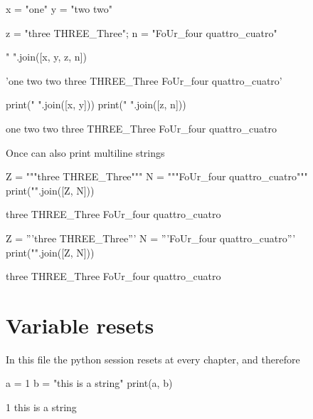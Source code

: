 \documentclass{book}
\begin{document}
\begin{pycell}
x = "one"
y = "two two"
\end{pycell}

\begin{pycell}
z = "three THREE_Three"; n = "FoUr_four quattro_cuatro"
\end{pycell}

\begin{pycell}
" ".join([x, y, z, n])
\end{pycell}
\begin{pyexpectedoutput}
'one two two three THREE_Three FoUr_four quattro_cuatro'
\end{pyexpectedoutput}

\begin{pycell}
print(" ".join([x, y]))
print(" ".join([z, n]))
\end{pycell}
\begin{pyexpectedoutput}
one two two
three THREE_Three FoUr_four quattro_cuatro
\end{pyexpectedoutput}

Once can also print multiline strings
\begin{pycell}
Z = """three
THREE_Three"""
N = """FoUr_four
quattro_cuatro"""
print("\n".join([Z, N]))
\end{pycell}
\begin{pyexpectedoutput}
three
THREE_Three
FoUr_four
quattro_cuatro
\end{pyexpectedoutput}

\begin{pycell}
Z = '''three
THREE_Three'''
N = '''FoUr_four
quattro_cuatro'''
print("\n".join([Z, N]))
\end{pycell}
\begin{pyexpectedoutput}
three
THREE_Three
FoUr_four
quattro_cuatro
\end{pyexpectedoutput}

\chapter{Variable resets}

In this file the python session resets at every chapter, and therefore

\begin{pycell}
a = 1
b = "this is a string"
print(a, b)
\end{pycell}
\begin{pyexpectedoutput}
1 this is a string
\end{pyexpectedoutput}
\end{document}
